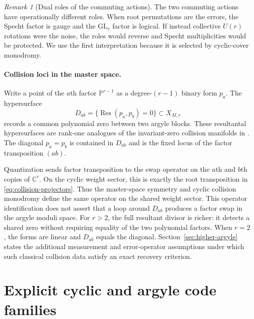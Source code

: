 \documentclass[11pt]{article}
\theoremstyle{definition}
\theoremstyle{remark}
\newtheorem{remark}[theorem]{Remark}
\newcommand{\C}{\mathbb C}
\newcommand{\Pp}{\mathbb P}
\newcommand{\Res}{\operatorname{Res}}
\begin{document}
\begin{remark}[Dual roles of the commuting actions]\label{rem:dual-actions}
The two commuting actions have operationally different roles.  When root permutations are the errors, the Specht factor is gauge and the $\mathrm{GL}_r$ factor is logical.  If instead collective $U(r)$ rotations were the noise, the roles would reverse and Specht multiplicities would be protected.  We use the first interpretation because it is selected by cyclic-cover monodromy.
\end{remark}

\paragraph{Collision loci in the master space.}

Write a point of the $a$th factor $\Pp^{r-1}$ as a degree-$(r-1)$ binary form $p_a$.  The hypersurface
\begin{equation}\label{eq:resultant-divisor}
 D_{ab}=\{\Res(p_a,p_b)=0\}\subset X_{M,r}
\end{equation}
records a common polynomial zero between two argyle blocks.  These resultantal hypersurfaces are rank-one analogues of the invariant-zero collision manifolds in \cite{RayanSundboArgyle2018}.  The diagonal $p_a=p_b$ is contained in $D_{ab}$ and is the fixed locus of the factor transposition $(ab)$.

Quantization sends factor transposition to the swap operator on the $a$th and $b$th copies of $\C^r$.  On the cyclic weight sector, this is exactly the root transposition in \eqref{eq:collision-projectors}.  Thus the master-space symmetry and cyclic collision monodromy define the same operator on the shared weight sector.  This operator identification does not assert that a loop around $D_{ab}$ produces a factor swap in the argyle moduli space.  For $r>2$, the full resultant divisor is richer: it detects a shared zero without requiring equality of the two polynomial factors.  When $r=2$, the forms are linear and $D_{ab}$ equals the diagonal.  Section~\ref{sec:higher-argyle} states the additional measurement and error-operator assumptions under which such classical collision data satisfy an exact recovery criterion.

\section{Explicit cyclic and argyle code families}\label{sec:six-sheet}
\end{document}
